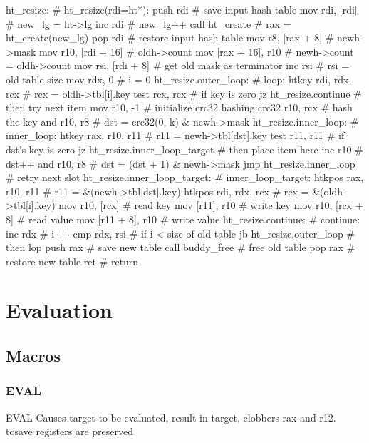\begin{asm}
ht_resize:				    # ht_resize(rdi=ht*):
	push	rdi			    #   save input hash table
	mov	rdi, [rdi]		    #   new_lg = ht->lg
	inc	rdi			    #   new_lg++
	call	ht_create		    #   rax = ht_create(new_lg)
	pop	rdi			    #   restore input hash table
	mov	r8, [rax + 8]		    #   newh->mask
	mov	r10, [rdi + 16]		    #   oldh->count
	mov	[rax + 16], r10		    #   newh->count = oldh->count
	mov	rsi, [rdi + 8]		    #   get old mask as terminator
	inc	rsi			    #   rsi = old table size
	mov	rdx, 0			    #   i = 0
ht_resize.outer_loop:			    # loop:
	htkey	rdi, rdx, rcx		    #   rcx = oldh->tbl[i].key
	test	rcx, rcx		    #   if key is zero
	jz	ht_resize.continue	    #   then try next item
	mov	r10, -1			    #   initialize crc32 hashing
	crc32	r10, rcx		    #   hash the key
	and	r10, r8			    #   dst = crc32(0, k) & newh->mask
ht_resize.inner_loop:			    # inner_loop:
	htkey	rax, r10, r11		    #   r11 = newh->tbl[dst].key
	test	r11, r11		    #   if dst's key is zero
	jz	ht_resize.inner_loop_target #   then place item here
	inc	r10			    #   dst++
	and	r10, r8			    #   dst = (dst + 1) & newh->mask
	jmp	ht_resize.inner_loop	    #   retry next slot
ht_resize.inner_loop_target:		    # inner_loop_target:
	htkpos	rax, r10, r11		    #   r11 = &(newh->tbl[dst].key)
	htkpos	rdi, rdx, rcx		    #   rcx = &(oldh->tbl[i].key)
	mov	r10, [rcx]		    #   read key
	mov	[r11], r10		    #   write key
	mov	r10, [rcx + 8]		    #   read value
	mov	[r11 + 8], r10		    #   write value
ht_resize.continue:			    # continue:
	inc	rdx			    #   i++
	cmp	rdx, rsi		    #   if i < size of old table
	jb	ht_resize.outer_loop	    #   then lop
	push	rax			    #   save new table
	call	buddy_free		    #   free old table
	pop	rax			    #   restore new table
	ret				    #   return
\end{asm}

\section{Evaluation}

\subsection{Macros}

\subsubsection{EVAL}

EVAL Causes target to be evaluated, result in target, clobbers
rax and r12.  tosave registers are preserved

